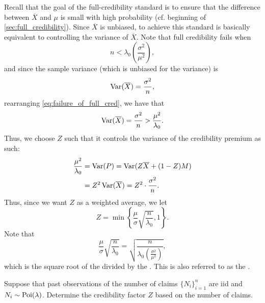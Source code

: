 \documentclass[notoc,notitlepage]{tufte-book}
\begin{document}
Recall that the goal of the full-credibility standard is to ensure that the
difference between $\overline{X}$ and $\mu$ is small with high probability (cf.
beginning of \cref{sec:full_credibility}). Since $\overline{X}$ is unbiased, to
achieve this standard is basically  equivalent to controlling the variance of
$\overline{X}$. Note that full credibility fails when
\begin{equation}\label{eq:failure_of_full_cred}
  n < \lambda_0 \left( \frac{\sigma^2}{\mu^2} \right),
\end{equation}
and since the sample variance (which is unbiased for the variance) is
\begin{equation*}
  \operatorname{Var}(\overline{X}) = \frac{\sigma^2}{n},
\end{equation*}
rearranging \cref{eq:failure_of_full_cred}, we have that
\begin{equation*}
  \operatorname{Var}(\overline{X}) = \frac{\sigma^2}{n} > \frac{\mu^2}{\lambda_0}.
\end{equation*}
Thus, we choose $Z$ such that it controls the variance of the credibility
premium as such:
\begin{align*}
  \frac{\mu^2}{\lambda_0} &= \operatorname{Var}(P) = \operatorname{Var}(Z \overline{X} + (1 - Z)M) \\
                          &= Z^2 \operatorname{Var}(\overline{X}) = Z^2 \cdot
                          \frac{\sigma^2}{n}.
\end{align*}
Thus, since we want $Z$ as a weighted average, we let
\begin{equation*}
  Z = \min \left\{ \frac{\mu}{\sigma} \sqrt{\frac{n}{\lambda_0}}, 1 \right\}.
\end{equation*}
 Note
that
\begin{equation*}
  \frac{\mu}{\sigma} \sqrt{\frac{n}{\lambda_0}} = \sqrt{\frac{n}{\lambda_0
  (\frac{\sigma^2}{\mu^2})}},
\end{equation*}
which is the square root of the  divided by
the . This is also
referred to as the .

\begin{eg}
  Suppose that past observations of the number of claims $\{ N_i \}_{i=1}^{n}$ 
  are iid and $N_i \sim \operatorname{Poi}(\lambda)$. Determine the credibility factor $Z$ 
  based on the number of claims.
\end{eg}
\end{document}
